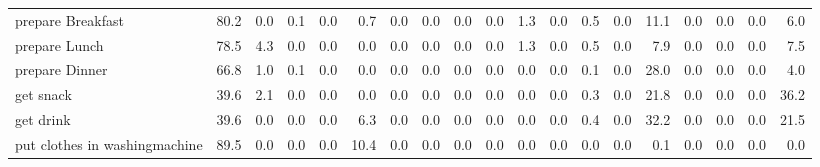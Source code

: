 \documentclass{article}
\begin{document}
\begin{sideways}
\begin{tabular}{lrrrrrrrrrrrrrrrrrr}
prepare Breakfast             &        80.2 &                0.0 &           0.1 &                          0.0 &                0.7 &                0.0 &                        0.0 &          0.0 &              0.0 &                1.3 &                    0.0 &                      0.5 &                  0.0 &                  11.1 &              0.0 &              0.0 &                                  0.0 &          6.0 \\
prepare Lunch                 &        78.5 &                4.3 &           0.0 &                          0.0 &                0.0 &                0.0 &                        0.0 &          0.0 &              0.0 &                1.3 &                    0.0 &                      0.5 &                  0.0 &                   7.9 &              0.0 &              0.0 &                                  0.0 &          7.5 \\
prepare Dinner                &        66.8 &                1.0 &           0.1 &                          0.0 &                0.0 &                0.0 &                        0.0 &          0.0 &              0.0 &                0.0 &                    0.0 &                      0.1 &                  0.0 &                  28.0 &              0.0 &              0.0 &                                  0.0 &          4.0 \\
get snack                     &        39.6 &                2.1 &           0.0 &                          0.0 &                0.0 &                0.0 &                        0.0 &          0.0 &              0.0 &                0.0 &                    0.0 &                      0.3 &                  0.0 &                  21.8 &              0.0 &              0.0 &                                  0.0 &         36.2 \\
get drink                     &        39.6 &                0.0 &           0.0 &                          0.0 &                6.3 &                0.0 &                        0.0 &          0.0 &              0.0 &                0.0 &                    0.0 &                      0.4 &                  0.0 &                  32.2 &              0.0 &              0.0 &                                  0.0 &         21.5 \\
put clothes in washingmachine &        89.5 &                0.0 &           0.0 &                          0.0 &               10.4 &                0.0 &                        0.0 &          0.0 &              0.0 &                0.0 &                    0.0 &                      0.0 &                  0.0 &                   0.1 &              0.0 &              0.0 &                                  0.0 &          0.0 \\

\end{tabular}
\end{sideways}
\end{document}
